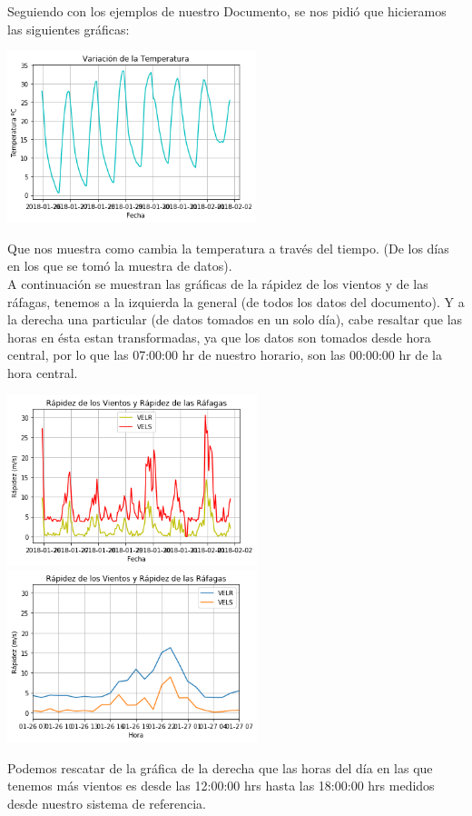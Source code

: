 \documentclass[12pt]{article}
\begin{document}
Seguiendo con los ejemplos de nuestro Documento, se nos pidió que hicieramos las siguientes gráficas:
\begin{center}
	\includegraphics[height=5cm]{output_13_0.png}
\end{center}
Que nos muestra como cambia la temperatura a través del tiempo. (De los días en los que se tomó la muestra de datos).\\

A continuación se muestran las gráficas de la rápidez de los vientos y de las ráfagas, tenemos a la izquierda la general (de todos los datos del documento). Y a la derecha una particular (de datos tomados en un solo día), cabe resaltar que las horas en ésta estan transformadas, ya que los datos son tomados desde hora central, por lo que las 07:00:00 hr de nuestro horario, son las 00:00:00 hr de la hora central.
\begin{center}
	\includegraphics[height=5cm]{output_14_0.png}
    \includegraphics[height=5cm]{output_15_0.png}
\end{center}
Podemos rescatar de la gráfica de la derecha que las horas del día en las que tenemos más vientos es desde las 12:00:00 hrs hasta las 18:00:00 hrs medidos desde nuestro sistema de referencia.\\
\end{document}
